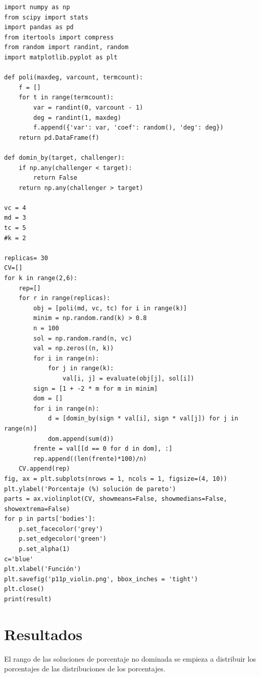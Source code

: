 \documentclass{article}
\begin{document}
\begin{lstlisting}
import numpy as np
from scipy import stats
import pandas as pd
from itertools import compress
from random import randint, random
import matplotlib.pyplot as plt

def poli(maxdeg, varcount, termcount):
    f = []
    for t in range(termcount):
        var = randint(0, varcount - 1)
        deg = randint(1, maxdeg)
        f.append({'var': var, 'coef': random(), 'deg': deg})
    return pd.DataFrame(f)
 
def domin_by(target, challenger):
    if np.any(challenger < target):
        return False
    return np.any(challenger > target)
 
vc = 4
md = 3
tc = 5
#k = 2 

replicas= 30
CV=[]
for k in range(2,6):
    rep=[]
    for r in range(replicas):
        obj = [poli(md, vc, tc) for i in range(k)]
        minim = np.random.rand(k) > 0.8
        n = 100
        sol = np.random.rand(n, vc)
        val = np.zeros((n, k))
        for i in range(n): 
            for j in range(k):
                val[i, j] = evaluate(obj[j], sol[i])
        sign = [1 + -2 * m for m in minim]
        dom = []
        for i in range(n):
            d = [domin_by(sign * val[i], sign * val[j]) for j in range(n)]
            dom.append(sum(d)) 
        frente = val[[d == 0 for d in dom], :]
        rep.append((len(frente)*100)/n)
    CV.append(rep)
fig, ax = plt.subplots(nrows = 1, ncols = 1, figsize=(4, 10))
plt.ylabel('Porcentaje (%) solución de pareto')
parts = ax.violinplot(CV, showmeans=False, showmedians=False, showextrema=False)
for p in parts['bodies']:
    p.set_facecolor('grey')
    p.set_edgecolor('green')
    p.set_alpha(1)
c='blue'
plt.xlabel('Función')
plt.savefig('p11p_violin.png', bbox_inches = 'tight')
plt.close()
print(result)
\end{lstlisting}


\section{Resultados}
El rango de las soluciones de porcentaje no dominada se empieza a distribuir los porcentajes de las distribuciones de los porcentajes.
\end{document}
